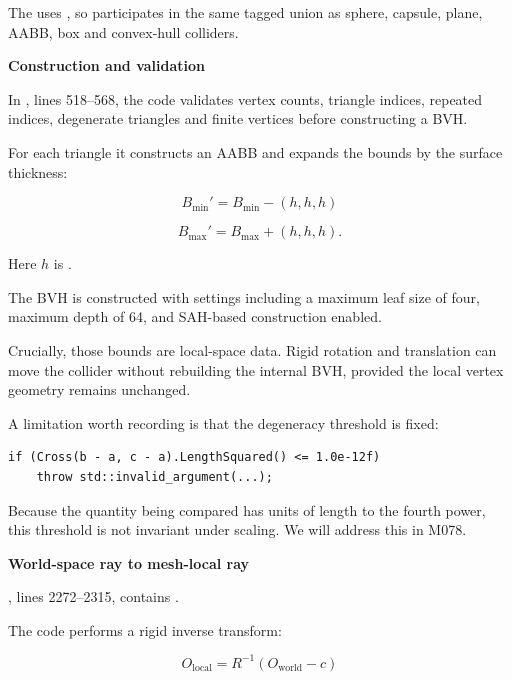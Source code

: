 The  uses , so  participates in the same tagged union as sphere, capsule, plane, AABB, box and convex-hull colliders.

\textbf{Construction and validation}

In , lines 518--568, the code validates vertex counts, triangle indices, repeated indices, degenerate triangles and finite vertices before constructing a BVH.

For each triangle it constructs an AABB and expands the bounds by the surface thickness:

\[
B_{\min}'=B_{\min}-(h,h,h)
\]

\[
B_{\max}'=B_{\max}+(h,h,h).
\]

Here \(h\) is .

The BVH is constructed with settings including a maximum leaf size of four, maximum depth of 64, and SAH-based construction enabled.

Crucially, those bounds are local-space data. Rigid rotation and translation can move the collider without rebuilding the internal BVH, provided the local vertex geometry remains unchanged.

A limitation worth recording is that the degeneracy threshold is fixed:

\begin{verbatim}
if (Cross(b - a, c - a).LengthSquared() <= 1.0e-12f)
    throw std::invalid_argument(...);
\end{verbatim}

Because the quantity being compared has units of length to the fourth power, this threshold is not invariant under scaling. We will address this in M078.

\textbf{World-space ray to mesh-local ray}

, lines 2272--2315, contains .

The code performs a rigid inverse transform:

\[
O_{\text{local}}=R^{-1}(O_{\text{world}}-c)
\]

